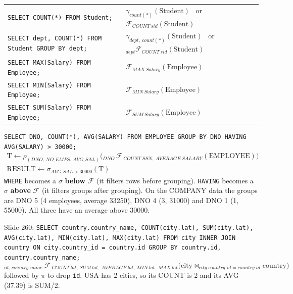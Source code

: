 \documentclass[10pt,a4paper]{article}
\newcommand{\R}[1]{\mathrm{#1}}          %
\newcommand{\agg}{\mathcal{F}}            %
\begin{document}
\begin{exbox}
\begin{tabularx}{\linewidth}{@{}X X@{}}
\texttt{SELECT COUNT(*) FROM Student;} & $\gamma_{count(*)}(\R{Student})$ \ or \ $\agg_{COUNT\ sid}(\R{Student})$\\
\texttt{SELECT dept, COUNT(*) FROM Student GROUP BY dept;} & $\gamma_{dept,\ count(*)}(\R{Student})$ \ or \ ${}_{dept}\agg_{COUNT\ sid}(\R{Student})$\\
\texttt{SELECT MAX(Salary) FROM Employee;} & $\agg_{MAX\ Salary}(\R{Employee})$\\
\texttt{SELECT MIN(Salary) FROM Employee;} & $\agg_{MIN\ Salary}(\R{Employee})$\\
\texttt{SELECT SUM(Salary) FROM Employee;} & $\agg_{SUM\ Salary}(\R{Employee})$\\
\end{tabularx}
\end{exbox}

\begin{exbox}
\texttt{SELECT DNO, COUNT(*), AVG(SALARY) FROM EMPLOYEE GROUP BY DNO HAVING AVG(SALARY) > 30000;}
\begin{gather*}
\R{T} \leftarrow \rho_{(DNO,\,NO\_EMPS,\,AVG\_SAL)}\Big({}_{DNO}\,\agg_{\,COUNT\ SSN,\ AVERAGE\ SALARY}(\R{EMPLOYEE})\Big) \\
\R{RESULT} \leftarrow \sigma_{AVG\_SAL > 30000}(\R{T})
\end{gather*}
\texttt{WHERE} becomes a $\sigma$ \textbf{below} $\agg$ (it filters rows before grouping). \texttt{HAVING} becomes a $\sigma$ \textbf{above} $\agg$ (it filters groups after grouping). On the COMPANY data the groups are DNO 5 (4 employees, average 33250), DNO 4 (3, 31000) and DNO 1 (1, 55000). All three have an average above 30000.

\medskip
Slide 260: \texttt{SELECT country.country\_name, COUNT(city.lat), SUM(city.lat), AVG(city.lat), MIN(city.lat), MAX(city.lat) FROM city INNER JOIN country ON city.country\_id = country.id GROUP BY country.id, country.country\_name;}
\[ {}_{id,\ country\_name}\ \agg_{\ COUNT\ lat,\ SUM\ lat,\ AVERAGE\ lat,\ MIN\ lat,\ MAX\ lat}\big(\R{city} \bowtie_{city.country\_id = country.id} \R{country}\big) \]
followed by $\pi$ to drop \texttt{id}. USA has 2 cities, so its COUNT is 2 and its AVG (37.39) is SUM/2.
\end{exbox}

\end{document}
